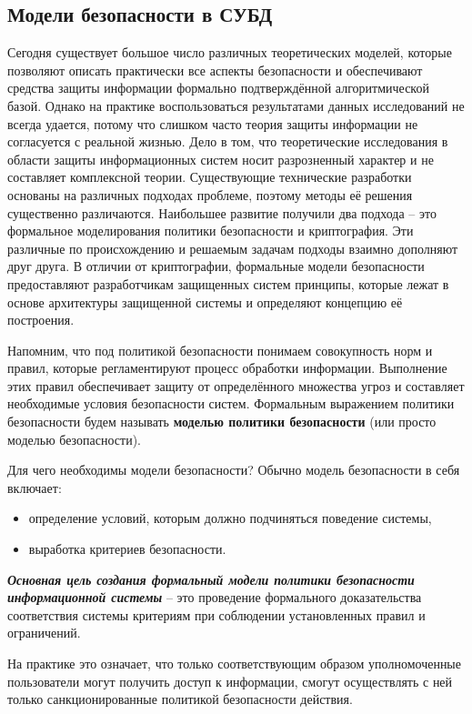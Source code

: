 \subsection{Модели безопасности в СУБД}

Сегодня существует большое число различных теоретических моделей, которые позволяют описать 
практически все аспекты безопасности и обеспечивают средства защиты информации формально 
подтверждённой алгоритмической базой. Однако на практике воспользоваться результатами данных 
исследований не всегда удается, потому что слишком часто теория защиты информации не согласуется 
с реальной жизнью. Дело в том, что теоретические исследования в области защиты информационных 
систем носит разрозненный характер и не составляет комплексной теории. Существующие технические 
разработки основаны на различных подходах проблеме, поэтому методы её решения существенно 
различаются. Наибольшее развитие получили два подхода -- это формальное моделирования политики 
безопасности и криптография. Эти различные по происхождению и решаемым задачам подходы взаимно 
дополняют друг друга. В отличии от криптографии, формальные модели безопасности предоставляют 
разработчикам защищенных систем принципы, которые лежат в основе архитектуры защищенной системы 
и определяют концепцию её построения.

Напомним, что под политикой безопасности понимаем совокупность норм и правил, которые регламентируют 
процесс обработки информации. Выполнение этих правил обеспечивает защиту от определённого 
множества угроз и составляет необходимые условия безопасности систем. Формальным выражением 
политики безопасности будем называть \textbf{моделью политики безопасности} (или просто моделью безопасности).

Для чего необходимы модели безопасности? Обычно модель безопасности в себя включает:
\begin{itemize}
    \item определение условий, которым должно подчиняться поведение системы,
    \item выработка критериев безопасности.
\end{itemize}
\textbf{\textit{Основная цель создания формальный модели политики безопасности информационной системы}} -- это 
проведение формального доказательства соответствия системы критериям при соблюдении 
установленных правил и ограничений.

На практике это означает, что только соответствующим образом уполномоченные пользователи могут 
получить доступ к информации, смогут осуществлять с ней только санкционированные политикой 
безопасности действия.

